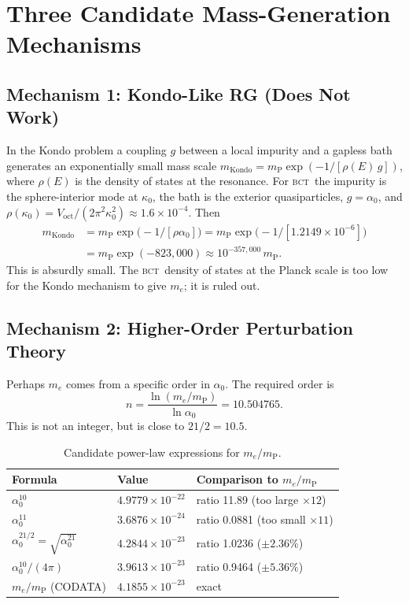 \documentclass[aps,prl,preprint,superscriptaddress,floatfix]{revtex4-2}
\newcommand{\az}{\alpha_0}
\newcommand{\mP}{m_{\mathrm{P}}}
\newcommand{\BCT}{\textsc{bct}}
\begin{document}
\section{Three Candidate Mass-Generation Mechanisms}
\label{sec:mechanisms}

\subsection{Mechanism 1: Kondo-Like RG (Does Not Work)}

In the Kondo problem a coupling $g$ between a local impurity and a gapless bath
generates an exponentially small mass scale
$m_{\mathrm{Kondo}} = \mP\exp(-1/[\rho(E)\,g])$, where $\rho(E)$ is the density
of states at the resonance. For \BCT\ the impurity is the sphere-interior mode
at $\kappa_0$, the bath is the exterior quasiparticles, $g=\az$, and
$\rho(\kappa_0) = V_{\mathrm{oct}}/(2\pi^2\kappa_0^2) \approx 1.6\times10^{-4}$.
Then
\begin{align}
  m_{\mathrm{Kondo}} &= \mP\exp\!\big(-1/[\rho\az]\big)
   = \mP\exp\!\big(-1/[1.2149\times10^{-6}]\big) \nonumber\\
  &= \mP\exp(-823{,}000) \approx 10^{-357{,}000}\,\mP .
\end{align}
This is absurdly small. The \BCT\ density of states at the Planck scale is too
low for the Kondo mechanism to give $m_e$; it is ruled out.

\subsection{Mechanism 2: Higher-Order Perturbation Theory}

Perhaps $m_e$ comes from a specific order in $\az$. The required order is
\begin{equation}
  n = \frac{\ln(m_e/\mP)}{\ln \az} = 10.504765 .
\end{equation}
This is not an integer, but is close to $21/2 = 10.5$.
\begin{table}[h]
\centering
\caption{Candidate power-law expressions for $m_e/\mP$.}
\label{tab:powers}
\begin{tabular}{lll}
\toprule
Formula & Value & Comparison to $m_e/\mP$ \\
\midrule
$\az^{10}$ & $4.9779\times10^{-22}$ & ratio 11.89 (too large $\times12$) \\
$\az^{11}$ & $3.6876\times10^{-24}$ & ratio 0.0881 (too small $\times11$) \\
$\az^{21/2}=\sqrt{\az^{21}}$ & $4.2844\times10^{-23}$ & ratio 1.0236 ($\pm2.36\%$) \\
$\az^{10}/(4\pi)$ & $3.9613\times10^{-23}$ & ratio 0.9464 ($\pm5.36\%$) \\
$m_e/\mP$ (CODATA) & $4.1855\times10^{-23}$ & exact \\
\bottomrule
\end{tabular}
\end{table}
\end{document}
